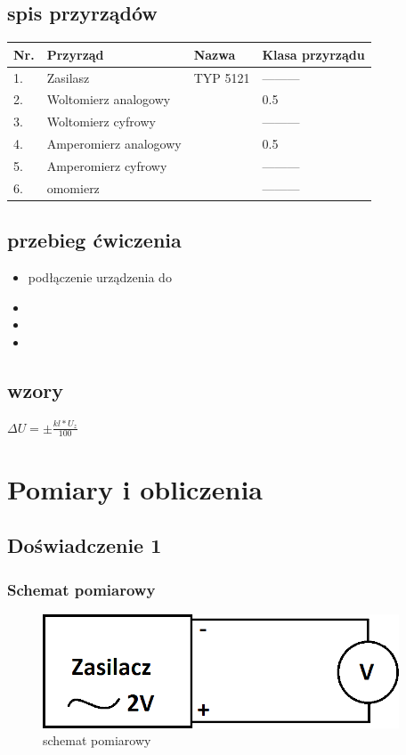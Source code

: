 \documentclass{article}  %
\begin{document}
    \subsection{spis przyrządów}
\begin{table}[H]
    \centering
    \begin{tabular}{|l|l|l|l|}
    \hline
    Nr.&Przyrząd             & Nazwa    & Klasa przyrządu    \\ \hline
    1. &Zasilasz             & TYP 5121 &   ---------        \\ \hline
    2. &Woltomierz analogowy &          &      0.5           \\ \hline
    3. &Woltomierz cyfrowy   &          &   ---------        \\ \hline
    4. &Amperomierz analogowy&          &      0.5           \\ \hline
    5. &Amperomierz cyfrowy  &          &   ---------        \\ \hline
    6. &omomierz             &          &   ---------        \\ \hline
    \end{tabular}
    \end{table}


\subsection{przebieg ćwiczenia}
    \begin{itemize}
        \item podłączenie urządzenia do 
        \item 
        \item 
        \item 
    \end{itemize}
\subsection{wzory}
$\Delta U = \pm \frac{kl \ast U_z}{100}$

\section{Pomiary i obliczenia}
\subsection{Doświadczenie 1}
\subsubsection{Schemat pomiarowy}
    \begin{figure}[H]
        \centering
        \includegraphics{zas-woltanal}
        \caption{schemat pomiarowy}
    \end{figure}
\end{document}
